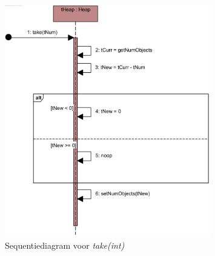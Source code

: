 \begin{figure}[htp]
	\includegraphics[width=0.8\textwidth]{chap-evaluatie/take.png}
	\caption{Sequentiediagram voor \textit{take(int)}}
	\label{fig:nim-take}
\end{figure}

%

%

%
%

